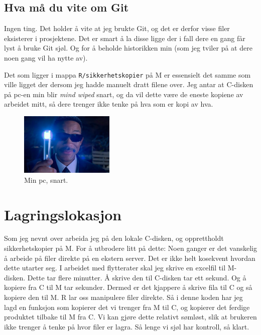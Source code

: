\documentclass[
  letterpaper,
  DIV=11,
  numbers=noendperiod]{scrreprt}
\begin{document}
\hypertarget{hva-muxe5-du-vite-om-git}{%
\subsection{Hva må du vite om Git}\label{hva-muxe5-du-vite-om-git}}

Ingen ting. Det holder å vite at jeg brukte Git, og det er derfor visse
filer eksisterer i prosjektene. Det er smart å la disse ligge der i fall
dere en gang får lyst å bruke Git sjøl. Og for å beholde historikken min
(som jeg tviler på at dere noen gang vil ha nytte av).

Det som ligger i mappa \texttt{R/sikkerhetskopier} på M er essensielt
det samme som ville ligget der dersom jeg hadde manuelt dratt filene
over. Jeg antar at C-disken på pc-en min blir \emph{mind wiped} snart,
og da vil dette være de eneste kopiene av arbeidet mitt, så dere trenger
ikke tenke på hva som er kopi av hva.

\begin{figure}

{\centering \includegraphics[width=0.4\textwidth,height=\textheight]{./img/mind-wipe.jpg}

}

\caption{Min pc, snart.}

\end{figure}

\hypertarget{lagringslokasjon}{%
\section{Lagringslokasjon}\label{lagringslokasjon}}

Som jeg nevnt over arbeida jeg på den lokale C-disken, og opprettholdt
sikkerhetskopier på M. For å utbrodere litt på dette: Noen ganger er det
vanskelig å arbeide på filer direkte på en ekstern server. Det er ikke
helt kosekvent hvordan dette utarter seg. I arbeidet med flytterater
skal jeg skrive en excelfil til M-disken. Dette tar flere minutter. Å
skrive den til C-disken tar ett sekund. Og å kopiere fra C til M tar
sekunder. Dermed er det kjappere å skrive fila til C og så kopiere den
til M. R lar oss manipulere filer direkte. Så i denne koden har jeg lagd
en funksjon som kopierer det vi trenger fra M til C, og kopierer det
ferdige produktet tilbake til M fra C. Vi kan gjøre dette relativt
sømløst, slik at brukeren ikke trenger å tenke på hvor filer er lagra.
Så lenge vi sjøl har kontroll, så klart.
\end{document}
